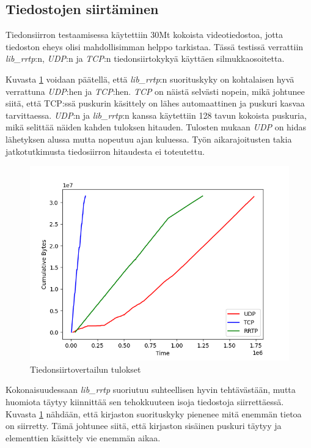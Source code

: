 \documentclass[a4paper,12pt]{article}
\begin{document}
    \subsection{Tiedostojen siirtäminen}


Tiedonsiirron testaamisessa käytettiin 30Mt kokoista videotiedostoa, jotta 
tiedoston eheys olisi mahdollisimman helppo tarkistaa.
Tässä testissä verrattiin \textit{lib\_rrtp}:n, \textit{UDP}:n ja \textit{TCP}:n 
tiedonsiirtokykyä käyttäen silmukkaosoitetta. \par
Kuvasta \ref{fig:performance} voidaan päätellä, että 
\textit{lib\_rrtp}:n suorituskyky on kohtalaisen hyvä verrattuna \textit{UDP}:hen ja \textit{TCP}:hen. \textit{TCP} on näistä selvästi nopein, mikä johtunee siitä, että
TCP:ssä puskurin käsittely on lähes automaattinen ja puskuri kasvaa tarvittaessa. 
\textit{UDP}:n ja \textit{lib\_rrtp}:n kanssa käytettiin 128 tavun kokoista puskuria, mikä selittää näiden kahden tuloksen hitauden. Tulosten mukaan \textit{UDP} on 
hidas lähetyksen alussa mutta nopeutuu ajan kuluessa. Työn aikarajoitusten takia jatkotutkimusta tiedosiirron hitaudesta ei toteutettu. \par
    
    \begin{figure}[h!]
        \centering
        \includegraphics[width=\textwidth]{doc/latex/src/images/plot.png}
        \caption{Tiedonsiirtovertailun tulokset}
        \label{fig:performance}
    \end{figure}

    
Kokonaisuudessaan \textit{lib\_rrtp} suoriutuu suhteellisen hyvin tehtävästään, mutta huomiota täytyy kiinnittää sen tehokkuuteen isoja tiedostoja siirrettäessä. Kuvasta \ref{fig:performance} nähdään, että kirjaston suorituskyky pienenee mitä enemmän tietoa on siirretty. Tämä johtunee siitä, että kirjaston sisäinen puskuri täytyy ja elementtien käsittely vie enemmän aikaa.
\end{document}
